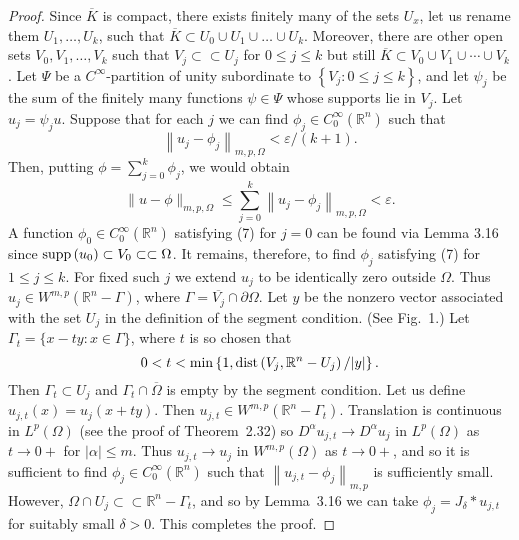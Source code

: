 \begin{proof}
  Since $\overline{K}$ is compact, there exists finitely many of the sets $U_x$,
  let us rename them $U_1, \ldots, U_k$,
  such that $\overline{K} \subset U_0 \cup U_1 \cup \ldots \cup U_k$.
  Moreover, there are other open sets $V_0, V_1, \ldots, V_k$
  such that $V_j \subset\subset U_j$ for $0 \leq j \leq k$
  but still $\overline{K} \subset V_0 \cup V_1 \cup \cdots \cup V_k$.
  Let $\Psi$ be a $C^{\infty}$-partition of unity subordinate to $\left\{V_j: 0 \leq j \leq k\right\}$, and let $\psi_j$ be the sum of the finitely many functions $\psi \in \Psi$ whose supports lie in $V_j$. Let $u_j=\psi_j u$. Suppose that for each $j$ we can find $\phi_j \in C_0^{\infty}\left(\mathbb{R}^n\right)$ such that
  \begin{equation}\label{eq:3.7}
    \left\|u_j-\phi_j\right\|_{m, p, \Omega}<\varepsilon /(k+1) .
  \end{equation}
  Then, putting $\phi=\sum_{j=0}^k \phi_j$, we would obtain
  \[
  \|u-\phi\|_{m, p, \Omega} \leq \sum_{j=0}^k\left\|u_j-\phi_j\right\|_{m, p, \Omega}<\varepsilon .
  \]
  A function $\phi_0 \in C_0^{\infty}\left(\mathbb{R}^n\right)$ satisfying (7) for $j=0$ can be 
  found via Lemma 3.16 since $\operatorname{supp}\left(u_0\right) \subset V_0 \subset\subset \Omega$.
  It remains, therefore, to find $\phi_j$ satisfying (7) for $1 \leq j \leq k$.
  For fixed such $j$ we extend $u_j$ to be identically zero outside $\Omega$.
  Thus $u_j \in W^{m, p}\left(\mathbb{R}^n-\Gamma\right)$,
  where $\Gamma=\overline{V_j} \cap\partial\Omega$.
  Let $y$ be the nonzero vector associated with the set $U_j$ in the definition of the segment 
  condition. (See Fig.~1.) Let $\Gamma_t=\{x-t y: x \in \Gamma\}$, where $t$ is so chosen that
  \[
  0<t<\min \left\{1, \operatorname{dist}\left(V_j, \mathbb{R}^n-U_j\right) /|y|\right\}.
  \]
  Then $\Gamma_t \subset U_j$ and $\Gamma_t \cap \overline{\Omega}$ is empty by the segment condition. 
  Let us define $u_{j, t}(x)=u_j(x+t y)$.
  Then $u_{j, t} \in W^{m, p}\left(\mathbb{R}^n-\Gamma_t\right)$.
  Translation is continuous in $L^p(\Omega)$ (see the proof of Theorem~2.32)
  so $D^\alpha u_{j, t} \rightarrow D^\alpha u_j$ in $L^p(\Omega)$
  as $t \rightarrow 0+$ for $|\alpha| \leq m$.
  Thus $u_{j, t} \rightarrow u_j$ in $W^{m,p}(\Omega)$ as $t \rightarrow 0+$,
  and so it is sufficient to find $\phi_j \in C_0^{\infty}\left(\mathbb{R}^n\right)$
  such that $\left\|u_{j, t}-\phi_j\right\|_{m, p}$ is sufficiently small.
  However, $\Omega \cap U_j \subset\subset \mathbb{R}^n-\Gamma_t$,
  and so by Lemma~3.16 we can take $\phi_j=J_\delta * u_{j, t}$ for suitably small $\delta>0$. 
  This completes the proof.
\end{proof}


